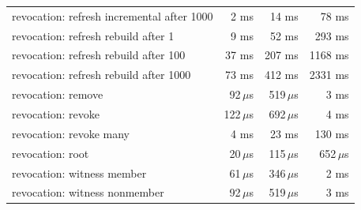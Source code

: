 \begin{tabular}{lrrr}
revocation: refresh incremental after 1000 & 2 ms & 14 ms & 78 ms \\
revocation: refresh rebuild after 1 & 9 ms & 52 ms & 293 ms \\
revocation: refresh rebuild after 100 & 37 ms & 207 ms & 1168 ms \\
revocation: refresh rebuild after 1000 & 73 ms & 412 ms & 2331 ms \\
revocation: remove & 92\,$\mu$s & 519\,$\mu$s & 3 ms \\
revocation: revoke & 122\,$\mu$s & 692\,$\mu$s & 4 ms \\
revocation: revoke many & 4 ms & 23 ms & 130 ms \\
revocation: root & 20\,$\mu$s & 115\,$\mu$s & 652\,$\mu$s \\
revocation: witness member & 61\,$\mu$s & 346\,$\mu$s & 2 ms \\
revocation: witness nonmember & 92\,$\mu$s & 519\,$\mu$s & 3 ms \\
\bottomrule
\end{tabular}
